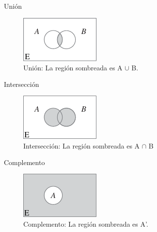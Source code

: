 \documentclass[11pt]{beamer}
\begin{document}
      \begin{frame}{Unión}
          \begin{figure}
              \centering
              \includegraphics[width=0.7\linewidth]{images/estadistica2}
              \caption{Unión: La región sombreada es A $\cup$ B.}
              \label{fig:estadistica2}
          \end{figure}

      \end{frame}
      \begin{frame}{Intersección}
        \begin{figure}
            \centering
            \includegraphics[width=0.7\linewidth]{images/estadistica3}
            \caption{Intersección: La región sombreada es A $\cap$ B}
            \label{fig:estadistica3}
        \end{figure}

      \end{frame}
      \begin{frame}{Complemento}
        \begin{figure}
            \centering
            \includegraphics[width=0.7\linewidth]{images/estadistica4}
            \caption{Complemento: La región sombreada es A'. }
            \label{fig:estadistica4}
        \end{figure}

      \end{frame}
\end{document}
